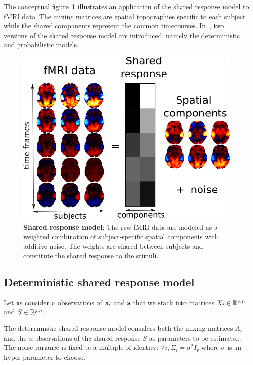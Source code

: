 \documentclass{article}
\begin{document}
The conceptual figure~\ref{fig:srm:conceptual_figure} illustrates an 
application of the shared response model to fMRI data.
%
The mixing matrices are spatial topographies specific to each subject
while the shared components represent the common timecourses.
%
In~\cite{chen2015reduced, anderson2016enabling}, two versions of the
shared response model are introduced, namely the deterministic and
probabilistic models.

\begin{figure}
  \centering
  \includegraphics[scale=0.3]{figures/srm/conceptual_figure33.png}
  \caption{\textbf{Shared response model}: The raw fMRI data are modeled as a
    weighted combination of subject-specific spatial components with additive
    noise.
    The weights are shared between subjects and constitute the shared response
    to the stimuli.
  }
  \label{fig:srm:conceptual_figure}
\end{figure}


\subsection{Deterministic shared response model}
\label{sec:deterministicsrm}
Let us consider $n$ observations of $\mathbf{x}_i$ and $\mathbf{s}$ that we stack into
matrices $X_i \in \mathbb{R}^{v, n}$ and $S \in \mathbb{R}^{p, n}$.


The deterministic shared response model considers both the mixing matrices $A_i$ and
the $n$ observations of the shared response $S$ as parameters to be
estimated.
%
The noise variance is fixed to a multiple of identity: $\forall i,
\Sigma_i=\sigma^2 I_v$ where $\sigma$ is an hyper-parameter to choose.
\end{document}
